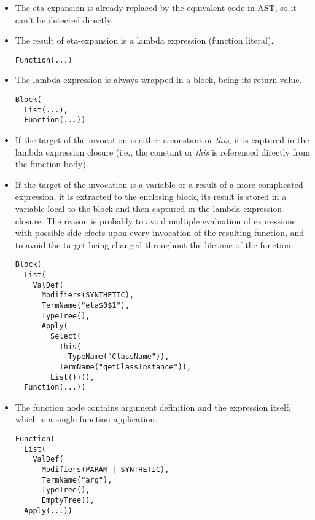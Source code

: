 \begin{itemize}
	\item The eta-expansion is already replaced by the equivalent code in AST, so it can't be detected directly.
	\item The result of eta-expansion is a lambda expression (function literal).
\lstset{style=Dump}
\begin{lstlisting}
Function(...)
\end{lstlisting}
	\item The lambda expression is always wrapped in a block, being its return value.
	
\lstset{style=Dump}
\begin{lstlisting}
Block(
  List(...), 
  Function(...))
\end{lstlisting}	
	
	\item If the target of the invocation is either a constant or \textit{this}, it is captured in the lambda expression closure (i.e., the constant or \textit{this} is referenced directly from the function body).
	
	\item If the target of the invocation is a variable or a result of a more complicated expression, it is extracted to the enclosing block, its result is stored in a variable local to the block and then captured in the lambda expression closure. The reason is probably to avoid multiple evaluation of expressions with possible side-efects upon every invocation of the resulting function, and to avoid the target being changed throughout the lifetime of the function.
	
\lstset{style=Dump}
\begin{lstlisting}
Block(
  List(
    ValDef(
      Modifiers(SYNTHETIC), 
      TermName("eta$0$1"), 
      TypeTree(), 
      Apply(
        Select(
          This(
            TypeName("ClassName")), 
          TermName("getClassInstance")), 
        List()))), 
  Function(...))
\end{lstlisting}

	\item The function node contains argument definition and the expression itself, which is a single function application.

\lstset{style=Dump}
\begin{lstlisting}
Function(
  List(
    ValDef(
      Modifiers(PARAM | SYNTHETIC), 
      TermName("arg"), 
      TypeTree(), 
      EmptyTree)), 
  Apply(...))
\end{lstlisting}

	
\end{itemize}

